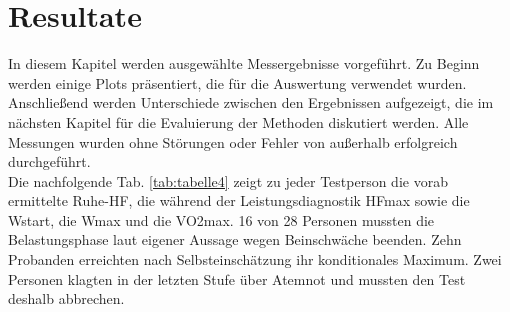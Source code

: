 \chapter{Resultate}
%
In diesem Kapitel werden ausgewählte Messergebnisse vorgeführt. Zu Beginn werden einige Plots präsentiert, die für die Auswertung verwendet wurden. Anschließend werden Unterschiede zwischen den Ergebnissen aufgezeigt, die im nächsten Kapitel für die Evaluierung der Methoden diskutiert werden. Alle Messungen wurden ohne Störungen oder Fehler von außerhalb erfolgreich durchgeführt.\\
Die nachfolgende Tab. \ref{tab:tabelle4} zeigt zu jeder Testperson die vorab ermittelte Ruhe-\gls{HF}, die während der Leistungsdiagnostik \gls{HFmax} sowie die \gls{Wstart}, die \gls{Wmax} und die \acrfull{VO2max}. 16 von 28 Personen mussten die Belastungsphase laut eigener Aussage wegen Beinschwäche beenden. Zehn Probanden erreichten nach Selbsteinschätzung ihr konditionales Maximum. Zwei Personen klagten in der letzten Stufe über Atemnot und mussten den Test deshalb abbrechen.
%
